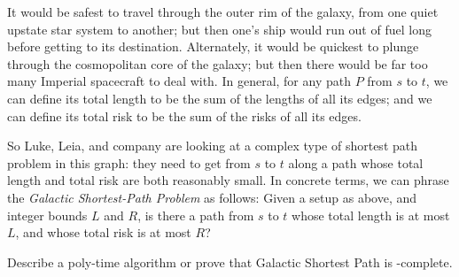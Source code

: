 \begin{questions}
  It would be safest to travel through the outer rim of the galaxy,
  from one quiet upstate star system to another; but then one's ship
  would run out of fuel long before getting to its
  destination. Alternately, it would be quickest to plunge through the
  cosmopolitan core of the galaxy; but then there would be far too
  many Imperial spacecraft to deal with. In general, for any path $P$
  from $s$ to $t$, we can define its total length to be the sum of the
  lengths of all its edges; and we can define its total risk to be the
  sum of the risks of all its edges.

  So Luke, Leia, and company are looking at a complex type of shortest
  path problem in this graph: they need to get from $s$ to $t$ along a
  path whose total length and total risk are both reasonably small. In
  concrete terms, we can phrase the \emph{Galactic Shortest-Path
    Problem} as follows: Given a setup as above, and integer bounds
  $L$ and $R$, is there a path from $s$ to $t$ whose total length is
  at most $L$, and whose total risk is at most $R$?

  Describe a poly-time algorithm or prove that Galactic Shortest Path
  is \NP-complete.
  
\end{questions}



